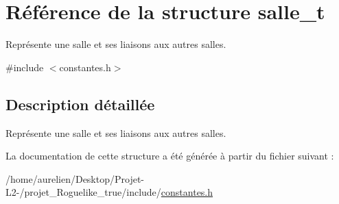\hypertarget{structsalle__t}{}\section{Référence de la structure salle\+\_\+t}
\label{structsalle__t}


Représente une salle et ses liaisons aux autres salles.  




{\ttfamily \#include $<$constantes.\+h$>$}



\subsection{Description détaillée}
Représente une salle et ses liaisons aux autres salles. 

La documentation de cette structure a été générée à partir du fichier suivant \+:\begin{DoxyCompactItemize}
\item 
/home/aurelien/\+Desktop/\+Projet-\/\+L2-\//projet\+\_\+\+Roguelike\+\_\+true/include/\hyperlink{constantes_8h}{constantes.\+h}\end{DoxyCompactItemize}

